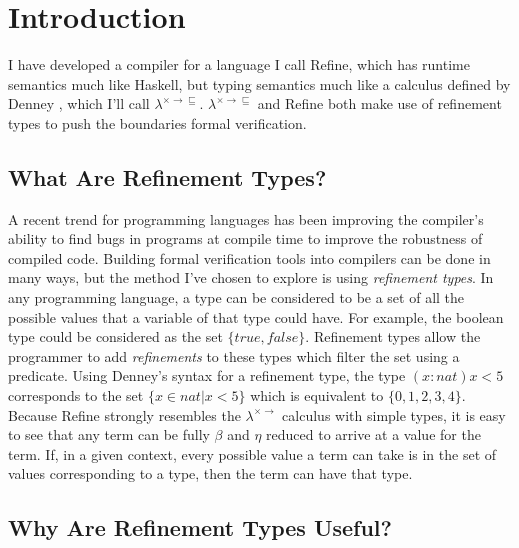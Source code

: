 \section{Introduction}

I have developed a compiler for a language I call Refine,
which has runtime semantics much like Haskell, but typing semantics much like a calculus defined
by Denney \cite{denney98}, which I'll call $\lambda^{\times \rightarrow \sqsubseteq}$.
$\lambda^{\times \rightarrow \sqsubseteq}$ and Refine both make use of refinement types to push
the boundaries formal verification.

\subsection{What Are Refinement Types?}

A recent trend for programming languages has been improving the compiler's ability to find
bugs in programs at compile time to improve the robustness of compiled code.
Building formal verification tools into compilers can be done in many ways, but the method
I've chosen to explore is using \textit{refinement types}.
In any programming language, a type can be considered to be a set of all the possible values
that a variable of that type could have.
For example, the boolean type could be considered as the set $\{true, false\}$.
Refinement types allow the programmer to add \textit{refinements} to these types which
filter the set using a predicate.
Using Denney's syntax for a refinement type, the type
$(x:nat)x<5$ corresponds to the set $\{x \in nat | x < 5\}$ which is equivalent to
$\{0, 1, 2, 3, 4\}$.
Because Refine strongly resembles the $\lambda^{\times \rightarrow}$ calculus
with simple types, it is easy to see that any term can be fully $\beta$ and $\eta$ reduced to
arrive at a value for the term.
If, in a given context, every possible value a term can take is in the set of values corresponding to
a type, then the term can have that type.

\subsection{Why Are Refinement Types Useful?}

